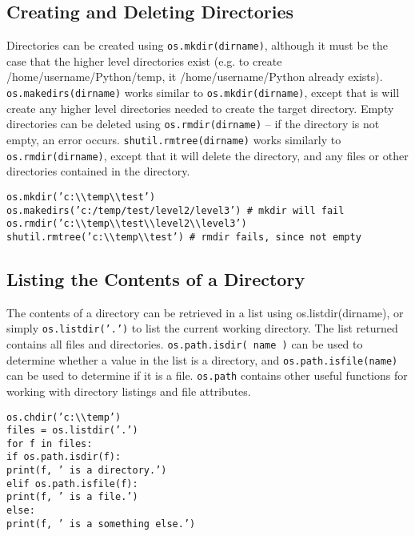 \documentclass[PyData.tex]{subfiles}
\begin{document}
\subsection{Creating and Deleting Directories}
Directories can be created using \texttt{os.mkdir(dirname)}, although it must be the case that the higher level directories
exist (e.g. to create /home/username/Python/temp, it /home/username/Python already exists). \texttt{os.makedirs(dirname)}
works similar to \texttt{os.mkdir(dirname)}, except that is will create any higher level directories needed to create
the target directory.
Empty directories can be deleted using \texttt{os.rmdir(dirname)} – if the directory is not empty, an error
occurs. \texttt{shutil.rmtree(dirname)} works similarly to \texttt{os.rmdir(dirname)}, except that it will delete the directory,
and any files or other directories contained in the directory.
\begin{framed}
\begin{verbatim}
os.mkdir(’c:\\temp\\test’)
os.makedirs(’c:/temp/test/level2/level3’) # mkdir will fail
os.rmdir(’c:\\temp\\test\\level2\\level3’)
shutil.rmtree(’c:\\temp\\test’) # rmdir fails, since not empty
\end{verbatim}
\end{framed}
\subsection{ Listing the Contents of a Directory}
The contents of a directory can be retrieved in a list using os.listdir(dirname), or simply \texttt{os.listdir(’.’)}
to list the current working directory. The list returned contains all files and directories. \texttt{os.path.isdir(
name )} can be used to determine whether a value in the list is a directory, and \texttt{os.path.isfile(name)}
can be used to determine if it is a file. \texttt{os.path} contains other useful functions for working with directory
listings and file attributes.
\begin{framed}
\begin{verbatim}
os.chdir(’c:\\temp’)
files = os.listdir(’.’)
for f in files:
if os.path.isdir(f):
print(f, ’ is a directory.’)
elif os.path.isfile(f):
print(f, ’ is a file.’)
else:
print(f, ’ is a something else.’)
\end{verbatim}
\end{framed}
\end{document}
